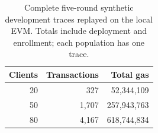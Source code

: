 \begin{table}[t]\centering\caption{Complete five-round synthetic development traces replayed on the local EVM. Totals include deployment and enrollment; each population has one trace.}
\begin{tabular}{rrr}\toprule Clients & Transactions & Total gas \\ \midrule
20 & 327 & 52,344,109 \\
50 & 1,707 & 257,943,763 \\
80 & 4,167 & 618,744,834 \\
\bottomrule\end{tabular}\label{tab:scaling}\end{table}
